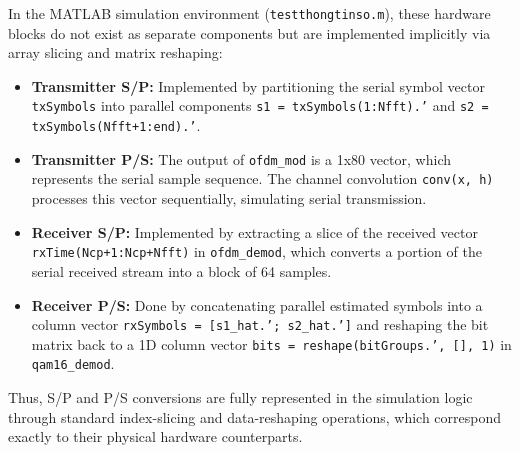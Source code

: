 \documentclass[a4paper]{article}
\begin{document}
In the MATLAB simulation environment (\texttt{testthongtinso.m}), these hardware blocks do not exist as separate components but are implemented implicitly via array slicing and matrix reshaping:
\begin{itemize}
    \item \textbf{Transmitter S/P:} Implemented by partitioning the serial symbol vector \texttt{txSymbols} into parallel components \texttt{s1 = txSymbols(1:Nfft).'} and \texttt{s2 = txSymbols(Nfft+1:end).'}.
    \item \textbf{Transmitter P/S:} The output of \texttt{ofdm\_mod} is a 1x80 vector, which represents the serial sample sequence. The channel convolution \texttt{conv(x, h)} processes this vector sequentially, simulating serial transmission.
    \item \textbf{Receiver S/P:} Implemented by extracting a slice of the received vector \texttt{rxTime(Ncp+1:Ncp+Nfft)} in \texttt{ofdm\_demod}, which converts a portion of the serial received stream into a block of 64 samples.
    \item \textbf{Receiver P/S:} Done by concatenating parallel estimated symbols into a column vector \texttt{rxSymbols = [s1\_hat.'; s2\_hat.']} and reshaping the bit matrix back to a 1D column vector \texttt{bits = reshape(bitGroups.', [], 1)} in \texttt{qam16\_demod}.
\end{itemize}
Thus, S/P and P/S conversions are fully represented in the simulation logic through standard index-slicing and data-reshaping operations, which correspond exactly to their physical hardware counterparts.
\end{document}

